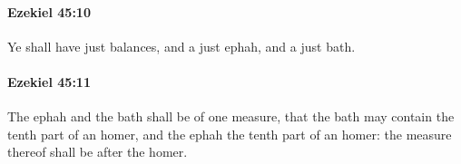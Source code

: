 		\paragraph{Ezekiel 45:10} %
			\label{EZEKIEL-45-10}

			Ye shall have just balances, and a just ephah, and a just bath.


		\paragraph{Ezekiel 45:11} %
			\label{EZEKIEL-45-11}

			The ephah and the bath shall be of one measure, that the bath may contain the tenth part of an homer, and the ephah the tenth part of an homer: the measure thereof shall be after the homer.


